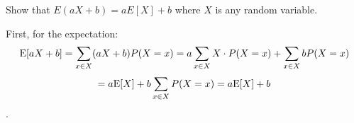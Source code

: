 \question Show that $E(aX + b) = aE[X] + b$ where $X$ is any random variable. 

\begin{solution}[1 cm]
First, for the expectation:
$$\text{E}[aX + b] = \sum_{x \in X} (aX + b) P(X = x)= a\sum_{x \in X} X \cdot P(X = x) + \sum_{x \in X} b P(X = x)$$$$= a\text{E}[X] + b\sum_{x \in X} P(X = x) = a\text{E}[X] + b$$.
\end{solution}


